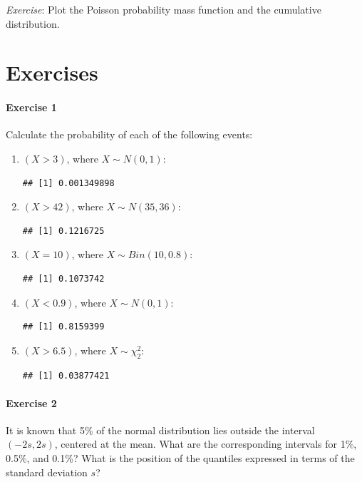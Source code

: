 \documentclass[
]{article}
\begin{document}
\emph{Exercise}: Plot the Poisson probability mass function and the
cumulative distribution.

\hypertarget{exercises}{%
\section{Exercises}\label{exercises}}

\hypertarget{exercise-1}{%
\paragraph{Exercise 1}\label{exercise-1}}

Calculate the probability of each of the following events:

\begin{enumerate}
\def\labelenumi{\arabic{enumi}.}
\item
  \((X > 3)\), where \(X \sim N(0,1)\):

\begin{verbatim}
## [1] 0.001349898
\end{verbatim}
\item
  \((X > 42)\), where \(X \sim N(35,36)\):

\begin{verbatim}
## [1] 0.1216725
\end{verbatim}
\item
  \((X = 10)\), where \(X \sim Bin(10,0.8)\):

\begin{verbatim}
## [1] 0.1073742
\end{verbatim}
\item
  \((X < 0.9)\), where \(X \sim N(0,1)\):

\begin{verbatim}
## [1] 0.8159399
\end{verbatim}
\item
  \((X > 6.5)\), where \(X \sim \chi^2_2\):

\begin{verbatim}
## [1] 0.03877421
\end{verbatim}
\end{enumerate}

\hypertarget{exercise-2}{%
\paragraph{Exercise 2}\label{exercise-2}}

It is known that 5\% of the normal distribution lies outside the
interval \((-2s, 2s)\), centered at the mean. What are the corresponding
intervals for 1\%, 0.5\%, and 0.1\%? What is the position of the
quantiles expressed in terms of the standard deviation \(s\)?
\end{document}

